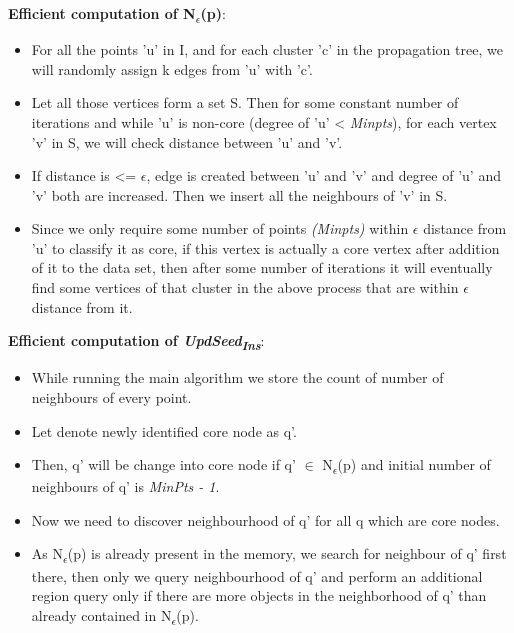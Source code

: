 \documentclass[acmsmall]{acmart}
\begin{document}
\begin{enumerate}
\begin{itemize}
        \textbf{Efficient computation of N\textsubscript{$\epsilon$}(p)}:
        \begin{itemize}
            \item For all the points 'u' in I, and for each cluster 'c' in the propagation tree, we will randomly assign k edges from 'u' with 'c'. 
            \item Let all those vertices form a set S. Then for some constant number of iterations and while 'u' is non-core (degree of 'u' < \textit{Minpts}), for each vertex 'v' in S, we will check distance between 'u' and 'v'. 
            \item If distance is <= $\epsilon$, edge is created between 'u' and 'v' and degree of 'u' and 'v' both are increased. Then we insert all the neighbours of 'v' in S. 
    
            \item Since we only require some number of points \textit{(Minpts)} within $\epsilon$ distance from 'u' to classify it as core, if this vertex is actually a core vertex after addition of it to the data set, then after some number of iterations it will eventually find some vertices of that cluster in the above process that are within $\epsilon$ distance from it. \\
        \end{itemize} 
     
        \textbf{Efficient computation of \textit{UpdSeed\textsubscript{Ins}}}:
        \begin{itemize}
            \item While running the main algorithm we store the count of number of neighbours of every point.
            \item Let denote newly identified core node as q'.
            
            \item Then, q' will be change into core node if q' $\in$ N\textsubscript{$\epsilon$}(p) and initial number of neighbours of  q' is \textit{MinPts - 1}.
            
            \item Now we need to discover neighbourhood of q' for all q which are core nodes.
            
            \item As N\textsubscript{$\epsilon$}(p) is already present in the memory, we search for neighbour of q' first there, then only we query neighbourhood of q’ and perform an additional region query only if there are more objects in the neighborhood of q’ than already contained in N\textsubscript{$\epsilon$}(p). \\ 
        \end{itemize}
        

\end{itemize}
\end{enumerate}
\end{document}
